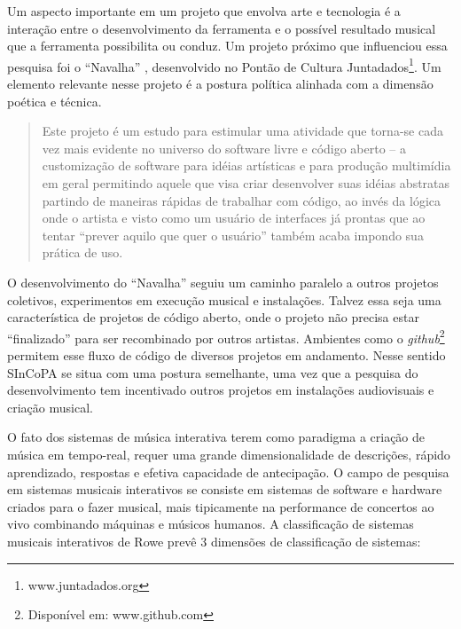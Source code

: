 \documentclass{ppgmus}
\begin{document}
Um aspecto importante em um projeto que envolva arte e tecnologia é a interação
entre o desenvolvimento da ferramenta e o possível resultado musical que a ferramenta
possibilita ou conduz.
Um projeto próximo que influenciou essa pesquisa foi o ``Navalha'' \cite{navalha}, 
desenvolvido no Pontão de Cultura Juntadados\footnote{www.juntadados.org}.
Um elemento relevante nesse projeto é a postura política alinhada com a dimensão
poética e técnica.

\begin{quote}
Este projeto é um estudo para estimular uma atividade que torna-se cada vez mais evidente no universo 
do software livre e código aberto – a customização de software para idéias artísticas e para produção 
multimídia em geral permitindo aquele que visa criar desenvolver suas idéias abstratas partindo de maneiras 
rápidas de trabalhar com código, ao invés da lógica onde o artista e visto como um usuário de interfaces já 
prontas que ao tentar “prever aquilo que quer o usuário” também acaba impondo sua prática de uso. \cite{navalha}
\end{quote}

O desenvolvimento do ``Navalha'' seguiu um caminho paralelo a outros projetos coletivos, experimentos em 
execução musical e instalações. Talvez essa seja uma característica de projetos de código aberto, onde
o projeto não precisa estar ``finalizado'' para ser recombinado por outros artistas. Ambientes como o 
\textit{github}\footnote{Disponível em: www.github.com} permitem esse fluxo de código de diversos projetos
em andamento. Nesse sentido SInCoPA se situa com uma postura semelhante, uma vez que a pesquisa do desenvolvimento
tem incentivado outros projetos em instalações audiovisuais e criação musical.



O fato dos sistemas de música interativa terem como
paradigma a criação de música em tempo-real,  requer uma grande
dimensionalidade de descrições, rápido aprendizado, respostas e
efetiva capacidade de antecipação. O campo de pesquisa em sistemas
musicais interativos \cite{rowe93:interactive} se consiste em sistemas de software e
hardware criados para o fazer musical, mais tipicamente na performance
de concertos ao vivo combinando máquinas e músicos humanos. 
A classificação de sistemas
musicais interativos de Rowe prevê 3 dimensões de classificação de
sistemas:
\end{document}

